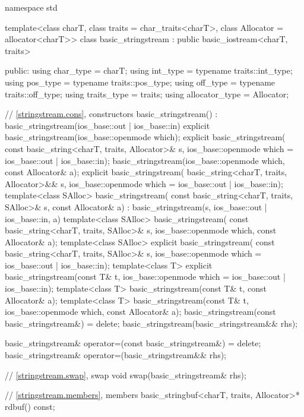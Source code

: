 %
\begin{codeblock}
namespace std {
  template<class charT, class traits = char_traits<charT>, class Allocator = allocator<charT>>
  class basic_stringstream : public basic_iostream<charT, traits> {
  public:
    using char_type      = charT;
    using int_type       = typename traits::int_type;
    using pos_type       = typename traits::pos_type;
    using off_type       = typename traits::off_type;
    using traits_type    = traits;
    using allocator_type = Allocator;

    // \ref{stringstream.cons}, constructors
    basic_stringstream() : basic_stringstream(ios_base::out | ios_base::in) {}
    explicit basic_stringstream(ios_base::openmode which);
    explicit basic_stringstream(
      const basic_string<charT, traits, Allocator>& s,
      ios_base::openmode which = ios_base::out | ios_base::in);
    basic_stringstream(ios_base::openmode which, const Allocator& a);
    explicit basic_stringstream(
      basic_string<charT, traits, Allocator>&& s,
      ios_base::openmode which = ios_base::out | ios_base::in);
    template<class SAlloc>
      basic_stringstream(
        const basic_string<charT, traits, SAlloc>& s, const Allocator& a)
        : basic_stringstream(s, ios_base::out | ios_base::in, a) {}
    template<class SAlloc>
      basic_stringstream(
        const basic_string<charT, traits, SAlloc>& s,
        ios_base::openmode which, const Allocator& a);
    template<class SAlloc>
      explicit basic_stringstream(
        const basic_string<charT, traits, SAlloc>& s,
        ios_base::openmode which = ios_base::out | ios_base::in);
    template<class T>
      explicit basic_stringstream(const T& t,
                                  ios_base::openmode which = ios_base::out | ios_base::in);
    template<class T>
      basic_stringstream(const T& t, const Allocator& a);
    template<class T>
      basic_stringstream(const T& t, ios_base::openmode which, const Allocator& a);
    basic_stringstream(const basic_stringstream&) = delete;
    basic_stringstream(basic_stringstream&& rhs);

    basic_stringstream& operator=(const basic_stringstream&) = delete;
    basic_stringstream& operator=(basic_stringstream&& rhs);

    // \ref{stringstream.swap}, swap
    void swap(basic_stringstream& rhs);

    // \ref{stringstream.members}, members
    basic_stringbuf<charT, traits, Allocator>* rdbuf() const;

}}
\end{codeblock}
